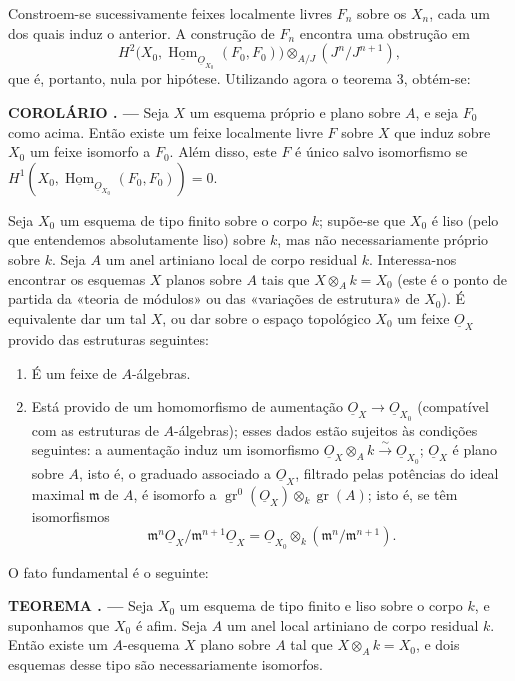 \documentclass[11pt,twoside,openany]{book}
\numberwithin{equation}{section}
\newcommand{\src}[1]{%
  \phantomsection\hypertarget{src:#1}{}%
  \marginpar{\raggedleft\footnotesize\sffamily #1}%
}
\newcommand{\Osh}{\underline{O}}
\newcommand{\Homsh}{\underline{\operatorname{Hom}}}
\theoremstyle{plain}
\theoremstyle{definition}
\theoremstyle{remark}
\newcommand{\result}[2]{%
  \par\medskip\noindent\textbf{#1%
  \if\relax\detokenize{#2}\relax\else\space#2\fi. ---}\enspace
}
\newcommand{\FgaUnitKey}{frontmatter}
\renewcommand{\src}[1]{%
  \phantomsection\hypertarget{src:\FgaUnitKey:#1}{}%
  \marginpar{\raggedleft\footnotesize\sffamily #1}%
}
\begin{document}
Constroem-se sucessivamente feixes localmente livres $F_n$ sobre os $X_n$, cada
um dos quais induz o anterior. A construção de $F_n$ encontra uma
obstrução em
\[
  H^2\bigl(X_0,\Homsh_{\Osh_{X_0}}(F_0,F_0)\bigr)
  \otimes_{A/J}(J^n/J^{n+1}),
\]
que é, portanto, nula por hipótese. Utilizando agora o teorema 3, obtém-se:

\result{COROLÁRIO}{1} Seja $X$ um esquema próprio e plano sobre $A$, e seja $F_0$
como acima. Então existe um feixe localmente livre $F$ sobre $X$ que induz
sobre $X_0$ um feixe isomorfo a $F_0$. Além disso, este $F$ é único salvo
isomorfismo se
$H^1(X_0,\Homsh_{\Osh_{X_0}}(F_0,F_0))=0$.

Seja $X_0$ um esquema de tipo finito sobre o corpo $k$; supõe-se que $X_0$ é
liso (pelo que entendemos absolutamente liso) sobre $k$, mas não
necessariamente próprio sobre $k$. Seja $A$ um anel artiniano local de corpo
residual $k$. Interessa-nos encontrar os esquemas $X$ planos sobre $A$ tais que
$X\otimes_A k=X_0$ (este é o ponto de partida da «teoria de módulos» ou
das «variações de estrutura» de $X_0$). É equivalente dar um tal $X$, ou dar
sobre o espaço topológico $X_0$ um feixe $\Osh_X$ provido das estruturas
seguintes:
\begin{enumerate}
  \item[\textit{i.}] É um feixe de $A$-álgebras.
  \item[\textit{ii.}] Está provido de um homomorfismo de aumentação
    $\Osh_X\longrightarrow\Osh_{X_0}$ (compatível com as estruturas de
    $A$-álgebras); esses dados estão sujeitos às condições seguintes: a
    aumentação induz um isomorfismo
    $\Osh_X\otimes_A k\xrightarrow{\sim}\Osh_{X_0}$; $\Osh_X$ é plano sobre
    $A$, isto é, o graduado associado a $\Osh_X$, filtrado pelas potências
    do ideal maximal $\mathfrak m$ de $A$, é isomorfo a
    $\operatorname{gr}^0(\Osh_X)\otimes_k\operatorname{gr}(A)$; isto é, se
    têm isomorfismos
    \[
      \mathfrak m^n\Osh_X/\mathfrak m^{n+1}\Osh_X
      =\Osh_{X_0}\otimes_k(\mathfrak m^n/\mathfrak m^{n+1}).
    \]
\end{enumerate}
O fato fundamental é o seguinte:

\src{204}
\result{TEOREMA}{8} Seja $X_0$ um esquema de tipo finito e liso sobre o
corpo $k$, e suponhamos que $X_0$ é afim. Seja $A$ um anel local artiniano de
corpo residual $k$. Então existe um $A$-esquema $X$ plano sobre $A$ tal que
$X\otimes_A k=X_0$, e dois esquemas desse tipo são necessariamente isomorfos.
\end{document}
